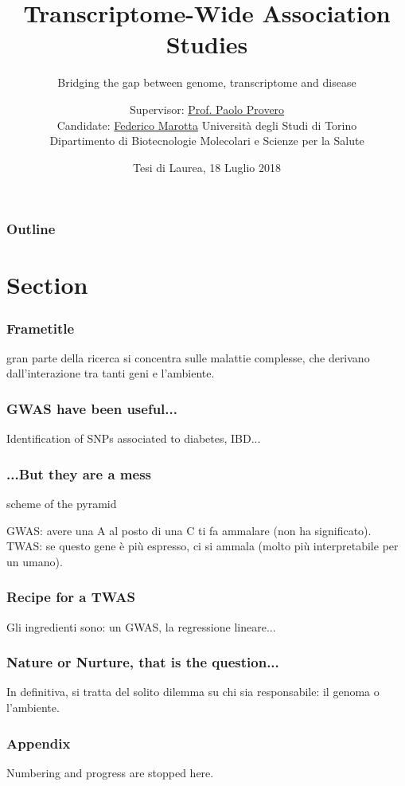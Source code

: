 \documentclass[aspectratio=169,12pt]{beamer}
\title{Transcriptome-Wide Association Studies}
\subtitle{\footnotesize Bridging the gap between genome, transcriptome 
	and disease}
\author[FM]
{
	Supervisor: \href{mailto:paolo.provero@unito.it}{Prof. Paolo 
		Provero}
	\\
	Candidate: \href{mailto:federico.marotta@edu.unito.it}{Federico 
		Marotta}
	\vfill
	\scriptsize
	Università degli Studi di Torino
	\\
	Dipartimento di Biotecnologie Molecolari e Scienze per la Salute
}
\institute[UniTo, DBMSS]
{



}
\date{\tiny Tesi di Laurea, 18 Luglio 2018}
\begin{document}
\maketitle

\begin{frame}
	\frametitle{Outline}
	\tableofcontents
\end{frame}

\section{Section}

\begin{frame}
    \frametitle{Frametitle}
	gran parte della ricerca si concentra sulle malattie complesse, che 
	derivano dall'interazione tra tanti geni e l'ambiente.

\end{frame}

\begin{frame}
	\frametitle{GWAS have been useful...}
	Identification of SNPs associated to diabetes, IBD...
\end{frame}

\begin{frame}
	\frametitle{...But they are a mess}
	scheme of the pyramid

	GWAS: avere una A al posto di una C ti fa ammalare (non ha 
	significato).
	TWAS: se questo gene è più espresso, ci si ammala (molto più 
	interpretabile per un umano).
\end{frame}

\begin{frame}
	\frametitle{Recipe for a TWAS}
	Gli ingredienti sono: un GWAS, la regressione lineare...
\end{frame}

\begin{frame}
	\frametitle{Nature or Nurture, that is the question...}
	In definitiva, si tratta del solito dilemma su chi sia responsabile: 
	il genoma o l'ambiente.
\end{frame}

\begin{frame}[allowframebreaks] %
	\frametitle{}
	\nocite{*}
	\printbibliography[title=Further Reading]
\end{frame}

\appendix

\begin{frame}
	\frametitle{Appendix}
	Numbering and progress are stopped here.
\end{frame}
\end{document}
